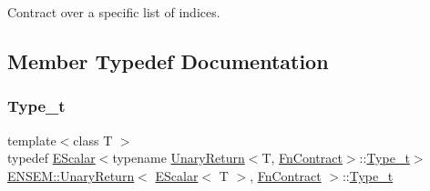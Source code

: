 Contract over a specific list of indices. 

\subsection{Member Typedef Documentation}
\mbox{\label{structENSEM_1_1UnaryReturn_3_01EScalar_3_01T_01_4_00_01FnContract_01_4_a0838f4fd4b6341784128502cc2256180}} 
\subsubsection{\texorpdfstring{Type\_t}{Type\_t}\hspace{0.1cm}{\footnotesize\ttfamily [1/2]}}
{\footnotesize\ttfamily template$<$class T $>$ \\
typedef \mbox{\hyperlink{classENSEM_1_1EScalar}{E\+Scalar}}$<$typename \mbox{\hyperlink{structENSEM_1_1UnaryReturn}{Unary\+Return}}$<$T, \mbox{\hyperlink{structENSEM_1_1FnContract}{Fn\+Contract}}$>$\+::\mbox{\hyperlink{structENSEM_1_1UnaryReturn_3_01EScalar_3_01T_01_4_00_01FnContract_01_4_a0838f4fd4b6341784128502cc2256180}{Type\+\_\+t}}$>$ \mbox{\hyperlink{structENSEM_1_1UnaryReturn}{E\+N\+S\+E\+M\+::\+Unary\+Return}}$<$ \mbox{\hyperlink{classENSEM_1_1EScalar}{E\+Scalar}}$<$ T $>$, \mbox{\hyperlink{structENSEM_1_1FnContract}{Fn\+Contract}} $>$\+::\mbox{\hyperlink{structENSEM_1_1UnaryReturn_3_01EScalar_3_01T_01_4_00_01FnContract_01_4_a0838f4fd4b6341784128502cc2256180}{Type\+\_\+t}}}

\mbox{\label{structENSEM_1_1UnaryReturn_3_01EScalar_3_01T_01_4_00_01FnContract_01_4_a0838f4fd4b6341784128502cc2256180}} 

